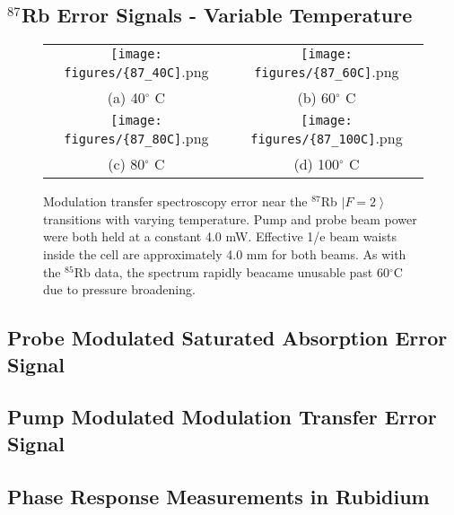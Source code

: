 \subsection{$^{87}$Rb Error Signals - Variable Temperature}
\begin{figure}[H]
  \begin{tabular}{cc}
    \texttt{[image: figures/\{87\_40C]}.png} &
    \texttt{[image: figures/\{87\_60C]}.png} \\
    (a) 40$^{\circ}$ C & (b) 60$^{\circ}$ C  \\[6pt]
    \texttt{[image: figures/\{87\_80C]}.png} &
    \texttt{[image: figures/\{87\_100C]}.png} \\
    (c) 80$^{\circ}$ C  & (d) 100$^{\circ}$ C  \\[6pt]
  \end{tabular}
  \caption{Modulation transfer spectroscopy error near the $^{87}$Rb $\left|F=2\right\rangle$ transitions with varying temperature. Pump and probe beam power were both held at a constant 4.0 mW. Effective 1/e beam waists inside the cell are approximately 4.0 mm for both beams. As with the $^{85}$Rb data, the spectrum rapidly beacame unusable past 60$^{\circ}$C due to pressure broadening.}
\end{figure}
\newpage

\subsection{Probe Modulated Saturated Absorption Error Signal}

\subsection{Pump Modulated Modulation Transfer Error Signal}

\subsection{Phase Response Measurements in Rubidium}